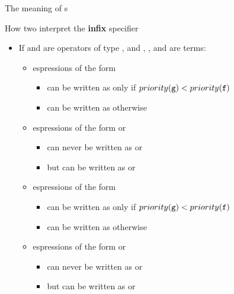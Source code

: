 \documentclass[handout]{beamer}
\begin{document}
\begin{frame}[allowframebreaks]{The meaning of s}
    \begin{exampleblock}{How two interpret the \textbf{infix} specifier }
        \begin{itemize}
            \item If  and  are operators of type , and , , and  are terms:
            \begin{itemize}
                \item espressions of the form \alert{}
                \begin{itemize}
                    \item can be written as \alert{} only if $priority(\texttt{g}) < priority(\texttt{f})$
                    \item can be written as \alert{} otherwise
                \end{itemize}

                \item espressions of the form \alert{} or \alert{}
                \begin{itemize}
                    \item can \alert{never} be written as \alert{} or \alert{}
                    \item but can be written as \alert{} or \alert{}
                \end{itemize}

                \item espressions of the form \alert{}
                \begin{itemize}
                    \item can be written as \alert{} only if $priority(\texttt{g}) < priority(\texttt{f})$
                    \item can be written as \alert{} otherwise
                \end{itemize}

                \item espressions of the form \alert{} or \alert{}
                \begin{itemize}
                    \item can \alert{never} be written as \alert{} or \alert{}
                    \item but can be written as \alert{} or \alert{}
                \end{itemize}
            \end{itemize}
        \end{itemize}
    \end{exampleblock}
\end{frame}
\end{document}
